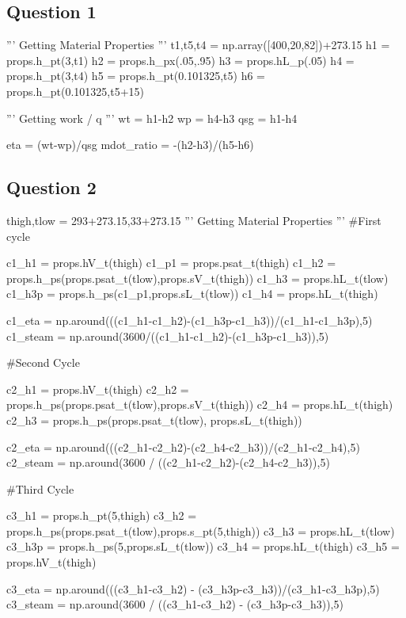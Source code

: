\documentclass{article}
\begin{document}
\subsection*{Question 1}\label{sec:q1code}

\begin{python}
    '''
    Getting Material Properties
    '''
    t1,t5,t4 = np.array([400,20,82])+273.15
    h1 = props.h_pt(3,t1)
    h2 = props.h_px(.05,.95)
    h3 = props.hL_p(.05)
    h4 = props.h_pt(3,t4)
    h5 = props.h_pt(0.101325,t5)
    h6 = props.h_pt(0.101325,t5+15)
    
    '''
    Getting work / q
    '''
    wt = h1-h2
    wp = h4-h3
    qsg = h1-h4
    
    eta = (wt-wp)/qsg
    mdot_ratio = -(h2-h3)/(h5-h6)
\end{python}

\subsection*{Question 2}\label{sec:q2code}

\begin{python}
    thigh,tlow = 293+273.15,33+273.15
    '''
    Getting Material Properties
    '''
    #First cycle
    
    c1_h1 = props.hV_t(thigh)
    c1_p1 = props.psat_t(thigh)
    c1_h2 = props.h_ps(props.psat_t(tlow),props.sV_t(thigh))
    c1_h3 = props.hL_t(tlow)
    c1_h3p = props.h_ps(c1_p1,props.sL_t(tlow))
    c1_h4 = props.hL_t(thigh)
    
    c1_eta = np.around(((c1_h1-c1_h2)-(c1_h3p-c1_h3))/(c1_h1-c1_h3p),5)
    c1_steam = np.around(3600/((c1_h1-c1_h2)-(c1_h3p-c1_h3)),5)
    
    #Second Cycle
    
    c2_h1 = props.hV_t(thigh)
    c2_h2 = props.h_ps(props.psat_t(tlow),props.sV_t(thigh))
    c2_h4 = props.hL_t(thigh)
    c2_h3 = props.h_ps(props.psat_t(tlow), props.sL_t(thigh))
    
    c2_eta = np.around(((c2_h1-c2_h2)-(c2_h4-c2_h3))/(c2_h1-c2_h4),5)
    c2_steam = np.around(3600 / ((c2_h1-c2_h2)-(c2_h4-c2_h3)),5)
    
    #Third Cycle
    
    c3_h1 = props.h_pt(5,thigh)
    c3_h2 = props.h_ps(props.psat_t(tlow),props.s_pt(5,thigh))
    c3_h3 = props.hL_t(tlow)
    c3_h3p = props.h_ps(5,props.sL_t(tlow))
    c3_h4 = props.hL_t(thigh)
    c3_h5 = props.hV_t(thigh)
    
    c3_eta = np.around(((c3_h1-c3_h2) - (c3_h3p-c3_h3))/(c3_h1-c3_h3p),5)
    c3_steam = np.around(3600 / ((c3_h1-c3_h2) - (c3_h3p-c3_h3)),5)
    
\end{python}
\end{document}
